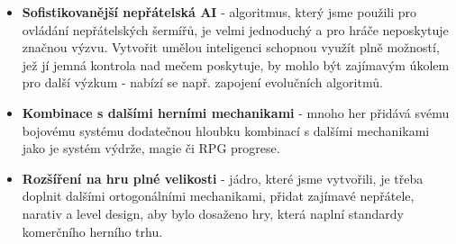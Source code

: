 \begin{itemize}
    \item \textbf{Sofistikovanější nepřátelská AI} - algoritmus, který jsme použili pro ovládání nepřátelských šermířů, je velmi jednoduchý a pro hráče neposkytuje značnou výzvu. Vytvořit umělou inteligenci schopnou využít plně možností, jež jí jemná kontrola nad mečem poskytuje, by mohlo být zajímavým úkolem pro další výzkum - nabízí se např. zapojení evolučních algoritmů.    
    \item \textbf{Kombinace s dalšími herními mechanikami} - mnoho her přidává svému bojovému systému dodatečnou hloubku kombinací s dalšími mechanikami jako je systém výdrže, magie či \acs{RPG} progrese.
    \item \textbf{Rozšíření na hru plné velikosti} - jádro, které jsme vytvořili, je třeba doplnit dalšími ortogonálními mechanikami, přidat zajímavé nepřátele, narativ a level design, aby bylo dosaženo hry, která naplní standardy komerčního herního trhu. 
\end{itemize}
